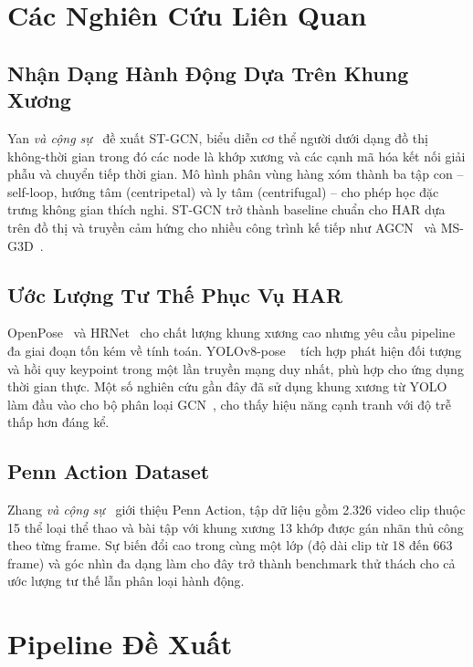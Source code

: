 \documentclass[conference]{IEEEtran}
\begin{document}
\section{Các Nghiên Cứu Liên Quan}
\label{sec:related}

\subsection{Nhận Dạng Hành Động Dựa Trên Khung Xương}
Yan \textit{và cộng sự}~\cite{yan2018stgcn} đề xuất ST-GCN, biểu diễn cơ thể
người dưới dạng đồ thị không-thời gian trong đó các node là khớp xương và các
cạnh mã hóa kết nối giải phẫu và chuyển tiếp thời gian. Mô hình phân vùng hàng
xóm thành ba tập con -- self-loop, hướng tâm (centripetal) và ly tâm (centrifugal)
-- cho phép học đặc trưng không gian thích nghi. ST-GCN trở thành baseline chuẩn
cho HAR dựa trên đồ thị và truyền cảm hứng cho nhiều công trình kế tiếp như
AGCN~\cite{shi2019agcn} và MS-G3D~\cite{liu2020msg3d}.

\subsection{Ước Lượng Tư Thế Phục Vụ HAR}
OpenPose~\cite{cao2019openpose} và HRNet~\cite{sun2019hrnet} cho chất lượng khung
xương cao nhưng yêu cầu pipeline đa giai đoạn tốn kém về tính toán. YOLOv8-pose
~\cite{ultralytics2023yolov8} tích hợp phát hiện đối tượng và hồi quy keypoint
trong một lần truyền mạng duy nhất, phù hợp cho ứng dụng thời gian thực. Một số
nghiên cứu gần đây đã sử dụng khung xương từ YOLO làm đầu vào cho bộ phân loại
GCN~\cite{liu2023yologcn}, cho thấy hiệu năng cạnh tranh với độ trễ thấp hơn
đáng kể.

\subsection{Penn Action Dataset}
Zhang \textit{và cộng sự}~\cite{zhang2013pennaction} giới thiệu Penn Action, tập
dữ liệu gồm 2.326 video clip thuộc 15 thể loại thể thao và bài tập với khung
xương 13 khớp được gán nhãn thủ công theo từng frame. Sự biến đổi cao trong cùng
một lớp (độ dài clip từ 18 đến 663 frame) và góc nhìn đa dạng làm cho đây trở
thành benchmark thử thách cho cả ước lượng tư thế lẫn phân loại hành động.

\section{Pipeline Đề Xuất}
\label{sec:method}
\end{document}
